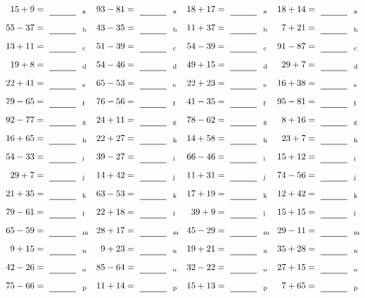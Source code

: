 \documentclass
[
  draft    = true,
  fontsize = 11pt,
  parskip  = half-
]
{scrartcl}
\begin{document}
\clearpage
\begin{align*}
    \pline{15+9}&=\rline{a}
  & \pline{93-81}&=\rline{a}
  & \pline{18+17}&=\rline{a}
  & \pline{18+14}&=\rline{a} \\[1ex]
    \pline{55-37}&=\rline{b}
  & \pline{43-35}&=\rline{b}
  & \pline{11+37}&=\rline{b}
  & \pline{7+21}&=\rline{b} \\[1ex]
    \pline{13+11}&=\rline{c}
  & \pline{51-39}&=\rline{c}
  & \pline{54-39}&=\rline{c}
  & \pline{91-87}&=\rline{c} \\[1ex]
    \pline{19+8}&=\rline{d}
  & \pline{54-46}&=\rline{d}
  & \pline{49+15}&=\rline{d}
  & \pline{29+7}&=\rline{d} \\[1ex]
    \pline{22+41}&=\rline{e}
  & \pline{65-53}&=\rline{e}
  & \pline{22+23}&=\rline{e}
  & \pline{16+38}&=\rline{e} \\[1ex]
    \pline{79-65}&=\rline{f}
  & \pline{76-56}&=\rline{f}
  & \pline{41-35}&=\rline{f}
  & \pline{95-81}&=\rline{f} \\[1ex]
    \pline{92-77}&=\rline{g}
  & \pline{24+11}&=\rline{g}
  & \pline{78-62}&=\rline{g}
  & \pline{8+16}&=\rline{g} \\[1ex]
    \pline{16+65}&=\rline{h}
  & \pline{22+27}&=\rline{h}
  & \pline{14+58}&=\rline{h}
  & \pline{23+7}&=\rline{h} \\[1ex]
    \pline{54-33}&=\rline{i}
  & \pline{39-27}&=\rline{i}
  & \pline{66-46}&=\rline{i}
  & \pline{15+12}&=\rline{i} \\[1ex]
    \pline{29+7}&=\rline{j}
  & \pline{14+42}&=\rline{j}
  & \pline{11+31}&=\rline{j}
  & \pline{74-56}&=\rline{j} \\[1ex]
    \pline{21+35}&=\rline{k}
  & \pline{63-53}&=\rline{k}
  & \pline{17+19}&=\rline{k}
  & \pline{12+42}&=\rline{k} \\[1ex]
    \pline{79-61}&=\rline{l}
  & \pline{22+18}&=\rline{l}
  & \pline{39+9}&=\rline{l}
  & \pline{15+15}&=\rline{l} \\[1ex]
    \pline{65-59}&=\rline{m}
  & \pline{28+17}&=\rline{m}
  & \pline{45-29}&=\rline{m}
  & \pline{29-11}&=\rline{m} \\[1ex]
    \pline{9+15}&=\rline{n}
  & \pline{9+23}&=\rline{n}
  & \pline{19+21}&=\rline{n}
  & \pline{35+28}&=\rline{n} \\[1ex]
    \pline{42-26}&=\rline{o}
  & \pline{85-64}&=\rline{o}
  & \pline{32-22}&=\rline{o}
  & \pline{27+15}&=\rline{o} \\[1ex]
    \pline{75-66}&=\rline{p}
  & \pline{11+14}&=\rline{p}
  & \pline{15+13}&=\rline{p}
  & \pline{7+65}&=\rline{p}
\end{align*}
\end{document}
